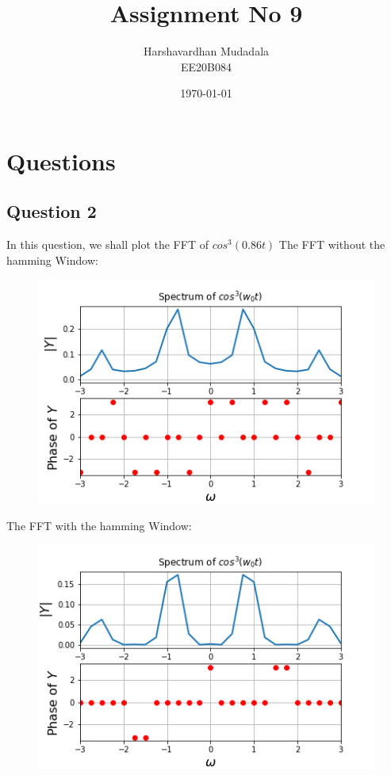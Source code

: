 \documentclass[11pt, a4paper]{article}
\title{Assignment No 9} %
\author{Harshavardhan Mudadala \\ EE20B084} %
\date{\today} %
\begin{document}
		
		
\maketitle %

\section{Questions}
\subsection{Question 2}
In this question, we shall plot the FFT of $cos^3(0.86t)$
The FFT without the hamming Window:
\begin{figure}[h!]
\centering
\includegraphics[scale=0.7]{fig1.png}
\label{fig:universe}
\end{figure}
\clearpage
The FFT with the hamming Window:
\begin{figure}[h!]
\centering
\includegraphics[scale=0.7]{fig2.png}
\label{fig:universe}
\end{figure}
\end{document}
